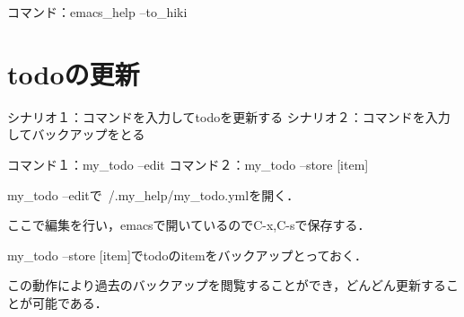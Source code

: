 コマンド：emacs\_help --to\_hiki

\section{todoの更新}
シナリオ１：コマンドを入力してtodoを更新する
シナリオ２：コマンドを入力してバックアップをとる

コマンド１：my\_todo --edit
コマンド２：my\_todo --store [item]

my\_todo --editで~/.my\_help/my\_todo.ymlを開く．

ここで編集を行い，emacsで開いているのでC-x,C-sで保存する．

my\_todo --store [item]でtodoのitemをバックアップとっておく．

この動作により過去のバックアップを閲覧することができ，どんどん更新することが可能である．

